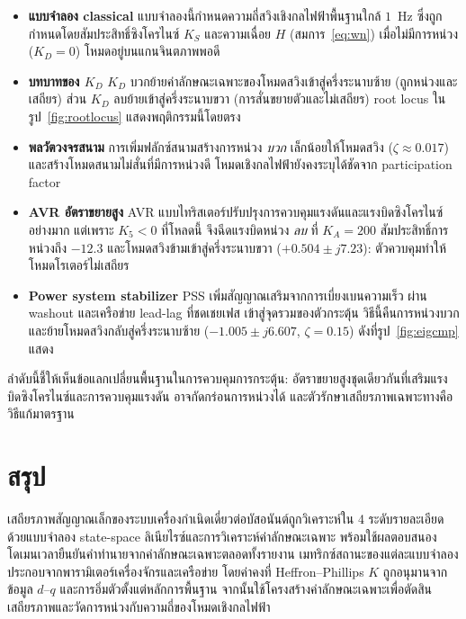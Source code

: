 \documentclass[12pt,a4paper]{article}
\begin{document}
\begin{itemize}
    \item \textbf{แบบจำลอง classical} แบบจำลองนี้กำหนดความถี่สวิงเชิงกลไฟฟ้าพื้นฐานใกล้ $1$~Hz
          ซึ่งถูกกำหนดโดยสัมประสิทธิ์ซิงโครไนซ์ $K_S$ และความเฉื่อย $H$
          (สมการ~\ref{eq:wn}) เมื่อไม่มีการหน่วง ($K_D=0$) โหมดอยู่บนแกนจินตภาพพอดี
    \item \textbf{บทบาทของ $K_D$} $K_D$ บวกย้ายค่าลักษณะเฉพาะของโหมดสวิงเข้าสู่ครึ่งระนาบซ้าย
          (ถูกหน่วงและเสถียร) ส่วน $K_D$ ลบย้ายเข้าสู่ครึ่งระนาบขวา
          (การสั่นขยายตัวและไม่เสถียร) root locus ในรูป~\ref{fig:rootlocus}
          แสดงพฤติกรรมนี้โดยตรง
    \item \textbf{พลวัตวงจรสนาม} การเพิ่มฟลักซ์สนามสร้างการหน่วง \emph{บวก} เล็กน้อยให้โหมดสวิง
          ($\zeta\approx0.017$) และสร้างโหมดสนามไม่สั่นที่มีการหน่วงดี
          โหมดเชิงกลไฟฟ้ายังคงระบุได้ชัดจาก participation factor
    \item \textbf{AVR อัตราขยายสูง} AVR แบบไทริสเตอร์ปรับปรุงการควบคุมแรงดันและแรงบิดซิงโครไนซ์อย่างมาก
          แต่เพราะ $K_5<0$ ที่โหลดนี้ จึงฉีดแรงบิดหน่วง \emph{ลบ}
          ที่ $K_A=200$ สัมประสิทธิ์การหน่วงถึง $-12.3$
          และโหมดสวิงข้ามเข้าสู่ครึ่งระนาบขวา ($+0.504\pm j7.23$):
          ตัวควบคุมทำให้โหมดโรเตอร์ไม่เสถียร
    \item \textbf{Power system stabilizer} PSS เพิ่มสัญญาณเสริมจากการเบี่ยงเบนความเร็ว
          ผ่าน washout และเครือข่าย lead-lag ที่ชดเชยเฟส เข้าสู่จุดรวมของตัวกระตุ้น
          วิธีนี้คืนการหน่วงบวกและย้ายโหมดสวิงกลับสู่ครึ่งระนาบซ้าย
          ($-1.005\pm j6.607$, $\zeta=0.15$) ดังที่รูป~\ref{fig:eigcmp} แสดง
\end{itemize}

ลำดับนี้ชี้ให้เห็นข้อแลกเปลี่ยนพื้นฐานในการควบคุมการกระตุ้น:
อัตราขยายสูงชุดเดียวกันที่เสริมแรงบิดซิงโครไนซ์และการควบคุมแรงดัน
อาจกัดกร่อนการหน่วงได้ และตัวรักษาเสถียรภาพเฉพาะทางคือวิธีแก้มาตรฐาน

\section{สรุป}

เสถียรภาพสัญญาณเล็กของระบบเครื่องกำเนิดเดี่ยวต่อบัสอนันต์ถูกวิเคราะห์ใน 4 ระดับรายละเอียด
ด้วยแบบจำลอง state-space ลิเนียไรซ์และการวิเคราะห์ค่าลักษณะเฉพาะ
พร้อมใช้ผลตอบสนองโดเมนเวลายืนยันคำทำนายจากค่าลักษณะเฉพาะตลอดทั้งรายงาน
เมทริกซ์สถานะของแต่ละแบบจำลองประกอบจากพารามิเตอร์เครื่องจักรและเครือข่าย
โดยค่าคงที่ Heffron--Phillips $K$ ถูกอนุมานจากข้อมูล $d$--$q$ และการอิ่มตัวตั้งแต่หลักการพื้นฐาน
จากนั้นใช้โครงสร้างค่าลักษณะเฉพาะเพื่อตัดสินเสถียรภาพและวัดการหน่วงกับความถี่ของโหมดเชิงกลไฟฟ้า
\end{document}
